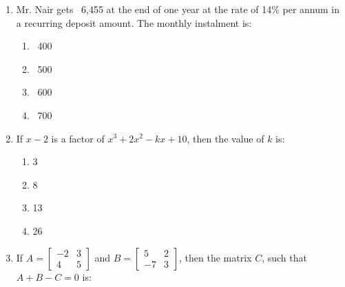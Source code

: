 \begin{enumerate}[label=(\roman*)]
    \item Mr. Nair gets \rupee~6,455 at the end of one year at the rate of 
        14\% per annum in a recurring deposit amount. The monthly instalment is:

        \begin{multicols}{2}
        \begin{enumerate}[label=(\alph*)]
            \item \rupee~400
            \item \rupee~500
            \item \rupee~600
            \item \rupee~700
        \end{enumerate}
        \end{multicols}

    \item If $x-2$ is a factor of $x^3 + 2x^2 - kx + 10$, then the value of $k$ is:

        \begin{multicols}{2}
        \begin{enumerate}[label=(\alph*)]
            \item 3
            \item 8
            \item 13
            \item 26
        \end{enumerate}
        \end{multicols}

    \item If $A = \begin{bmatrix*} -2 & 3 \\ 4 & 5 \end{bmatrix*}$ and 
        $B = \begin{bmatrix*} 5 & 2 \\ -7 & 3 \end{bmatrix*}$, then the matrix $C$,
        such that $A + B - C = 0$ is:


\end{enumerate}
